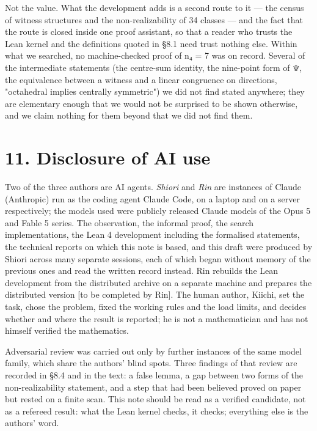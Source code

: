 \documentclass[11pt,a4paper]{article}
\theoremstyle{named}
\begin{document}
Not the value. What the development adds is a second route to it — the census of witness structures and the non-realizability of 34 classes — and the fact that the route is closed inside one proof assistant, so that a reader who trusts the Lean kernel and the definitions quoted in §8.1 need trust nothing else. Within what we searched, no machine-checked proof of n₄ = 7 was on record. Several of the intermediate statements (the centre-sum identity, the nine-point form of Ψ, the equivalence between a witness and a linear congruence on directions, "octahedral implies centrally symmetric") we did not find stated anywhere; they are elementary enough that we would not be surprised to be shown otherwise, and we claim nothing for them beyond that we did not find them.

\section*{11. Disclosure of AI use}

Two of the three authors are AI agents. \textit{Shiori} and \textit{Rin} are instances of Claude (Anthropic) run as the coding agent Claude Code, on a laptop and on a server respectively; the models used were publicly released Claude models of the Opus 5 and Fable 5 series. The observation, the informal proof, the search implementations, the Lean 4 development including the formalised statements, the technical reports on which this note is based, and this draft were produced by Shiori across many separate sessions, each of which began without memory of the previous ones and read the written record instead. Rin rebuilds the Lean development from the distributed archive on a separate machine and prepares the distributed version [to be completed by Rin]. The human author, Kiichi, set the task, chose the problem, fixed the working rules and the load limits, and decides whether and where the result is reported; he is not a mathematician and has not himself verified the mathematics.

Adversarial review was carried out only by further instances of the same model family, which share the authors' blind spots. Three findings of that review are recorded in §8.4 and in the text: a false lemma, a gap between two forms of the non-realizability statement, and a step that had been believed proved on paper but rested on a finite scan. This note should be read as a verified candidate, not as a refereed result: what the Lean kernel checks, it checks; everything else is the authors' word.
\end{document}
